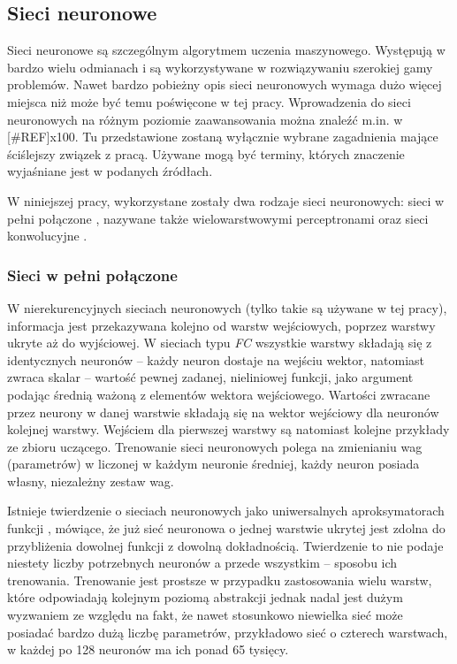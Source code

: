 \subsection{Sieci neuronowe}
\label{subsec:nn}

Sieci neuronowe  są szczególnym algorytmem uczenia maszynowego. Występują w bardzo wielu odmianach i są wykorzystywane w rozwiązywaniu szerokiej gamy problemów. Nawet bardzo pobieżny opis sieci neuronowych wymaga dużo więcej miejsca niż może być temu poświęcone w tej pracy. 
Wprowadzenia do sieci neuronowych na różnym poziomie zaawansowania można znaleźć m.in. w [\#REF]x100. 
Tu przedstawione zostaną wyłącznie wybrane zagadnienia mające ściślejszy związek z pracą. Używane mogą być terminy, których znaczenie wyjaśniane jest w podanych źródłach.

W niniejszej pracy, wykorzystane zostały dwa rodzaje sieci neuronowych: sieci w pełni połączone , nazywane także wielowarstwowymi perceptronami  oraz sieci konwolucyjne . 

\subsubsection*{Sieci w pełni połączone}
W nierekurencyjnych sieciach neuronowych (tylko takie są używane w tej pracy), informacja jest przekazywana kolejno od warstw wejściowych, poprzez warstwy ukryte aż do wyjściowej. 
W sieciach typu \textit{FC} wszystkie warstwy składają się z identycznych neuronów -- każdy neuron dostaje na wejściu wektor, natomiast zwraca skalar -- wartość pewnej zadanej, nieliniowej funkcji, jako argument podając średnią ważoną z elementów wektora wejściowego. Wartości zwracane przez neurony w danej warstwie składają się na wektor wejściowy dla neuronów kolejnej warstwy. Wejściem dla pierwszej warstwy są natomiast kolejne przykłady ze zbioru uczącego. Trenowanie sieci neuronowych polega na zmienianiu wag (parametrów) w liczonej w każdym neuronie średniej, każdy neuron posiada własny, niezależny zestaw wag.

Istnieje twierdzenie o sieciach neuronowych jako uniwersalnych aproksymatorach funkcji  \cite{hornik91}, mówiące, że już sieć neuronowa o jednej warstwie ukrytej jest zdolna do przybliżenia dowolnej funkcji z dowolną dokładnością. Twierdzenie to nie podaje niestety liczby potrzebnych neuronów a przede wszystkim -- sposobu ich trenowania. 
Trenowanie jest prostsze w przypadku zastosowania wielu warstw, które odpowiadają kolejnym poziomą abstrakcji jednak nadal jest dużym wyzwaniem ze względu na fakt, że nawet stosunkowo niewielka sieć może posiadać bardzo dużą liczbę parametrów, przykładowo sieć o czterech warstwach, w każdej po 128 neuronów ma ich ponad 65 tysięcy.


